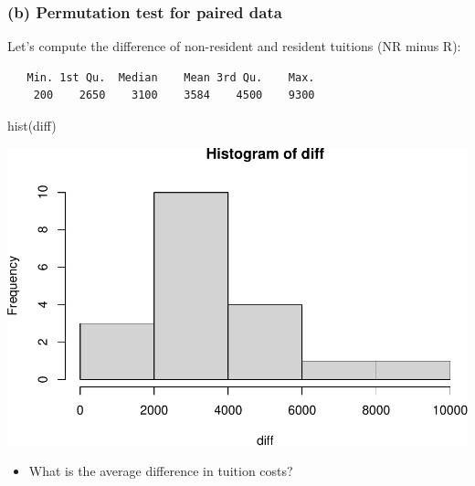 \documentclass[
]{book}
\newenvironment{Shaded}{\begin{snugshade}}{\end{snugshade}}
\newcommand{\FunctionTok}[1]{\textcolor[rgb]{0.00,0.00,0.00}{#1}}
\newcommand{\NormalTok}[1]{#1}
\newcommand{\OtherTok}[1]{\textcolor[rgb]{0.56,0.35,0.01}{#1}}
\newcommand{\SpecialCharTok}[1]{\textcolor[rgb]{0.00,0.00,0.00}{#1}}
\providecommand{\tightlist}{%
  \setlength{\itemsep}{0pt}\setlength{\parskip}{0pt}}
\begin{document}
\hypertarget{b-permutation-test-for-paired-data}{%
\subsubsection{(b) Permutation test for paired data}\label{b-permutation-test-for-paired-data}}

Let's compute the difference of non-resident and resident tuitions (NR minus R):

\begin{Shaded}
\end{Shaded}

\begin{verbatim}
   Min. 1st Qu.  Median    Mean 3rd Qu.    Max. 
    200    2650    3100    3584    4500    9300 
\end{verbatim}

\begin{Shaded}
\begin{Highlighting}[]
\FunctionTok{hist}\NormalTok{(diff)}
\end{Highlighting}
\end{Shaded}

\includegraphics[width=1\linewidth]{Class_Activity_13_files/figure-latex/unnamed-chunk-4-1}

\begin{itemize}
\tightlist
\item
  What is the average difference in tuition costs?
\end{itemize}
\end{document}
